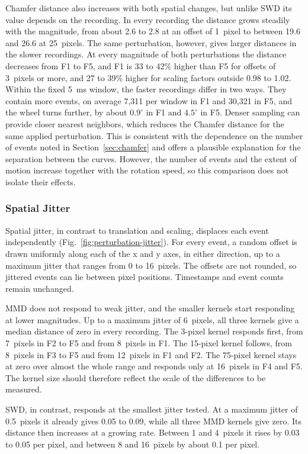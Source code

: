 Chamfer distance also increases with both spatial changes, but unlike SWD its value depends on the recording. In every recording the distance grows steadily with the magnitude, from about 2.6 to 2.8 at an offset of 1~pixel to between 19.6 and 26.6 at 25~pixels. The same perturbation, however, gives larger distances in the slower recordings. At every magnitude of both perturbations the distance decreases from F1 to F5, and F1 is 33 to 42\% higher than F5 for offsets of 3~pixels or more, and 27 to 39\% higher for scaling factors outside 0.98 to 1.02. Within the fixed 5~ms window, the faster recordings differ in two ways. They contain more events, on average 7,311 per window in F1 and 30,321 in F5, and the wheel turns further, by about $0.9^\circ$ in F1 and $4.5^\circ$ in F5. Denser sampling can provide closer nearest neighbors, which reduces the Chamfer distance for the same applied perturbation. This is consistent with the dependence on the number of events noted in Section~\ref{sec:chamfer} and offers a plausible explanation for the separation between the curves. However, the number of events and the extent of motion increase together with the rotation speed, so this comparison does not isolate their effects.


\subsubsection{Spatial Jitter}
\label{sec:jitter}

Spatial jitter, in contrast to translation and scaling, displaces each event independently (Fig.~\ref{fig:perturbation-jitter}). For every event, a random offset is drawn uniformly along each of the x and y axes, in either direction, up to a maximum jitter that ranges from 0 to 16~pixels. The offsets are not rounded, so jittered events can lie between pixel positions. Timestamps and event counts remain unchanged.

MMD does not respond to weak jitter, and the smaller kernels start responding at lower magnitudes. Up to a maximum jitter of 6~pixels, all three kernels give a median distance of zero in every recording. The 3-pixel kernel responds first, from 7~pixels in F2 to F5 and from 8~pixels in F1. The 15-pixel kernel follows, from 8~pixels in F3 to F5 and from 12~pixels in F1 and F2. The 75-pixel kernel stays at zero over almost the whole range and responds only at 16~pixels in F4 and F5. The kernel size should therefore reflect the scale of the differences to be measured.

SWD, in contrast, responds at the smallest jitter tested. At a maximum jitter of 0.5~pixels it already gives 0.05 to 0.09, while all three MMD kernels give zero. Its distance then increases at a growing rate. Between 1 and 4~pixels it rises by 0.03 to 0.05 per pixel, and between 8 and 16~pixels by about 0.1 per pixel.

